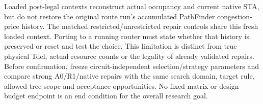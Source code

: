 Loaded post-legal contexts reconstruct actual occupancy and current native STA, but do not restore the original route run's accumulated PathFinder congestion-price history. The matched restricted/unrestricted repair controls share this fresh loaded context. Porting to a running router must state whether that history is preserved or reset and test the choice. This limitation is distinct from true physical Tdel, actual resource counts or the legality of already validated repairs. Before confirmation, freeze circuit-independent selection/strategy parameters and compare strong A0/R1/native repairs with the same search domain, target rule, allowed tree scope and acceptance opportunities. No fixed matrix or design-budget endpoint is an end condition for the overall research goal.
